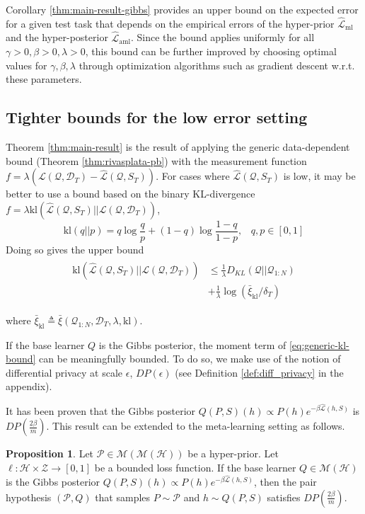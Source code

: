 \documentclass{article} %
\theoremstyle{definition}
\newtheorem{proposition}[theorem]{Proposition}
\begin{document}
Corollary \ref{thm:main-result-gibbs} provides an upper bound on the expected error for a given test task that depends on the empirical errors of the hyper-prior $\hat{\mathcal{L}}_{\mathrm{ml}}$ and the hyper-posterior $\hat{\mathcal{L}}_{\mathrm{aml}}$. 
Since the bound applies uniformly for all $\gamma>0,\beta>0,\lambda>0$, this bound can be further improved by choosing optimal values for $\gamma, \beta, \lambda$ through optimization algorithms such as gradient descent w.r.t.\! these parameters.

\subsection{Tighter bounds for the low error setting}

Theorem \ref{thm:main-result} is the result of applying the generic data-dependent bound (Theorem \ref{thm:rivasplata-pb}) with the measurement function $f=\lambda(\mathcal{L}(\mathcal{Q},\mathcal{D}_T)-\hat{\mathcal{L}}(\mathcal{Q}, S_T))$. For cases where $\hat{\mathcal{L}}(\mathcal{Q}, S_T)$ is low, it may be better to use a bound based on the binary KL-divergence $f=\lambda \mathrm{kl}(\hat{\mathcal{L}}(\mathcal{Q}, S_T)||\mathcal{L}(\mathcal{Q},\mathcal{D}_T))$, 
$$
\mathrm{kl}(q||p)=q \log\frac{q}{p}+(1-q)\log\frac{1-q}{1-p},\;\;\; q,p\in[0, 1]
$$
Doing so gives the upper bound
    \begin{align} \label{eq:generic-kl-bound}
\begin{split}
\mathrm{kl}(\hat{\mathcal{L}}(\mathcal{Q}, S_T)||\mathcal{L}(\mathcal{Q},\mathcal{D}_T)) &\leq \frac{1}{\lambda} D_{KL}(\mathcal{Q}||\mathcal{Q}_{1:N})\\
&+\frac{1}{\lambda}\log\left (\bar{\xi}_{\mathrm{kl}}/\delta_T\right ) 
\end{split}
\end{align}

where $\bar{\xi}_{\mathrm{kl}}\triangleq \bar{\xi}(\mathcal{Q}_{1:N}, \mathcal{D}_T,\lambda, \mathrm{kl}) .$

If the base learner $Q$ is the Gibbs posterior, the moment term of  \eqref{eq:generic-kl-bound} can be meaningfully bounded. To do so, we make use of the notion of differential privacy at scale $\epsilon$, $DP(\epsilon)$ (see Definition \ref{def:diff_privacy} in the appendix).

It has been proven \citep{McSherry2007, Rivasplata2020} that the Gibbs posterior $Q(P, S)(h)\propto P(h)e^{-\beta\hat{\mathcal{L}}(h, S)}$ is $DP\left (\frac{2\beta}{m}\right )$.
This result can be extended to the meta-learning setting as follows. 
%
\begin{proposition} \label{thm:pair-is-dp}
	Let $\mathcal{P}\in \mathcal{M}(\mathcal{M}(\mathcal{H}))$ be a hyper-prior.
	Let $\ell:\mathcal{H}\times \mathcal{Z}\rightarrow [0,1]$ be a bounded loss function. If the base learner $Q\in \mathcal{M}(\mathcal{H})$ is the Gibbs posterior $Q(P, S)(h)\propto P(h)e^{-\beta\hat{\mathcal{L}}(h, S)}$, 
	then the pair hypothesis $(\mathcal{P}, Q)$ that samples $P\sim\mathcal{P}$ and $h\sim Q(P, S)$ satisfies $DP\left (\frac{2\beta}{m}\right )$.
\end{proposition}
\end{document}
